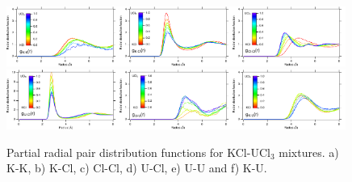 \documentclass[preprint,3p,10pt,number,sort&compress]{elsarticle}
\begin{document}
\begin{figure}[h!]
\centering
\includegraphics[width=0.33\textwidth]{rdf1.pdf}\includegraphics[width=0.33\textwidth]{rdf2.pdf}\includegraphics[width=0.33\textwidth]{rdf3.pdf}
\includegraphics[width=0.33\textwidth]{rdf4.pdf}\includegraphics[width=0.33\textwidth]{rdf5.pdf}\includegraphics[width=0.33\textwidth]{rdf6.pdf}
\caption{Partial radial pair distribution functions for KCl-UCl$_3$ mixtures. a) K-K, b) K-Cl, c) Cl-Cl, d) U-Cl, e) U-U and f) K-U.} 
\label{fig:fig_pair}
\end{figure}
\end{document}

